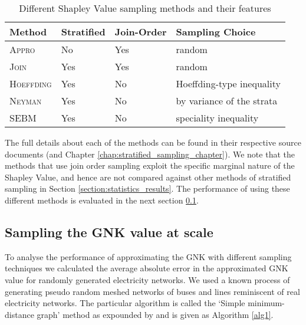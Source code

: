 \begin{table}[]
\centering
\begin{tabular}{|l|l|l|l|}
\hline
Method & Stratified & Join-Order & Sampling Choice \\ \hline
\textsc{Appro} & No & Yes & random\\
\textsc{Join} & Yes & Yes & random\\
\textsc{Hoeffding} & Yes & No & Hoeffding-type inequality \\
\textsc{Neyman} & Yes & No & by variance of the strata \\
\textsc{SEBM} & Yes & No & speciality inequality\\ \hline
\end{tabular}
\caption{Different Shapley Value sampling methods and their features}
\label{table:stratified_sampling_methods}
\end{table}

The full details about each of the methods can be found in their respective source documents \citep{CASTRO2017180,2013arXiv1306.4265M,DBLP:journals/cor/CastroGT09} (and Chapter \ref{chap:stratified_sampling_chapter}).
We note that the methods that use join order sampling exploit the specific marginal nature of the Shapley Value, and hence are not compared against other methods of stratified sampling in Section \ref{section:statistics_results}.
The performance of using these different methods is evaluated in the next section \ref{section:performance}.

\subsection{Sampling the GNK value at scale}\label{section:performance}

To analyse the performance of approximating the GNK with different sampling techniques we calculated the average absolute error in the approximated GNK value for randomly generated electricity networks.
We used a known process of generating pseudo random meshed networks of buses and lines reminiscent of real electricity networks. The particular algorithm is called the `Simple minimum-distance graph' method as expounded by \cite{hines1} and is given as Algorithm \ref{alg1}.

